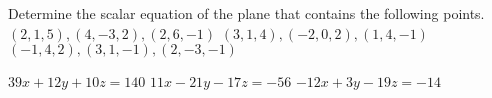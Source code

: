 
\begin{Exercise}[
name={},
title={}, 
difficulty=0,
origin={\cite{SM}}]
Determine the scalar equation of the plane that contains the following points.
\Question $(2,1,5),(4,-3,2),(2,6,-1)$
\Question $(3,1,4),(-2,0,2),(1,4,-1)$
\Question $(-1,4,2),(3,1,-1),(2,-3,-1)$
\end{Exercise}

\begin{Answer}
\Question $39x+12y+10z=140$
\Question $11x-21y-17z=-56$
\Question $-12x+3y-19z=-14$
\end{Answer}
